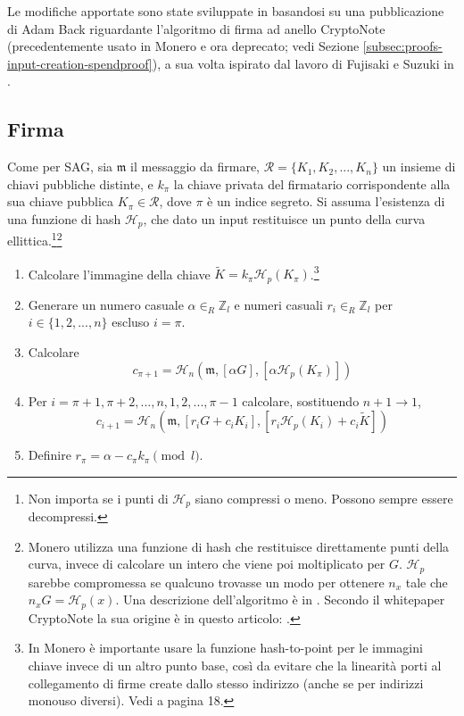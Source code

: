 Le modifiche apportate sono state sviluppate in \cite{MRL-0005-ringct} basandosi su una pubblicazione di Adam Back \cite{AdamBack-ring-efficiency} riguardante l’algoritmo di firma ad anello CryptoNote \cite{cryptoNoteWhitePaper} (precedentemente usato in Monero e ora deprecato; vedi Sezione \ref{subsec:proofs-input-creation-spendproof}), a sua volta ispirato dal lavoro di Fujisaki e Suzuki in \cite{Fujisaki2007}.


\subsection*{Firma}

Come per SAG, sia \(\mathfrak{m}\) il messaggio da firmare, \(\mathcal{R} = \{K_1, K_2, ..., K_n\}\) un insieme di chiavi pubbliche distinte, e \(k_\pi\) la chiave privata del firmatario corrispondente alla sua chiave pubblica \(K_\pi \in \mathcal{R}\), dove \(\pi\) è un indice segreto. Si assuma l'esistenza di una funzione di hash \(\mathcal{H}_p\), che dato un input restituisce un punto della curva ellittica.\footnote{Non importa se i punti di \(\mathcal{H}_p\) siano compressi o meno. Possono sempre essere decompressi.}\footnote{Monero utilizza una funzione di hash che restituisce direttamente punti della curva, invece di calcolare un intero che viene poi moltiplicato per \(G\). \(\mathcal{H}_p\) sarebbe compromessa se qualcuno trovasse un modo per ottenere \(n_x\) tale che \(n_x G = \mathcal{H}_p(x)\). Una descrizione dell'algoritmo è in \cite{hashtopoint-writeup}. Secondo il whitepaper CryptoNote \cite{cryptoNoteWhitePaper} la sua origine è in questo articolo: \cite{hashtopoint-original-paper}.}

\begin{enumerate}
	\item Calcolare l'immagine della chiave \(\tilde{K} = k_\pi \mathcal{H}_p(K_\pi)\).\footnote{In Monero è importante usare la funzione hash-to-point per le immagini chiave invece di un altro punto base, così da evitare che la linearità porti al collegamento di firme create dallo stesso indirizzo (anche se per indirizzi monouso diversi). Vedi \cite{cryptoNoteWhitePaper} a pagina 18.}

	\item Generare un numero casuale \(\alpha \in_R \mathbb{Z}_l\) e numeri casuali \(r_i \in_R \mathbb{Z}_l\) per \(i \in \{1, 2, ..., n\}\) escluso \(i = \pi\).

	\item Calcolare
	\[c_{\pi+1} = \mathcal{H}_n(\mathfrak{m}, [\alpha G], [\alpha \mathcal{H}_p(K_\pi)])\]

	\item Per \(i = \pi+1, \pi+2, ..., n, 1, 2, ..., \pi-1\) calcolare, sostituendo \(n + 1 \rightarrow 1\),\vspace{.175cm}
	\[c_{i+1} = \mathcal{H}_n(\mathfrak{m}, [r_i G + c_i K_i], [r_i \mathcal{H}_p(K_i) + c_i \tilde{K}])\]

	\item Definire \(r_\pi = \alpha - c_\pi k_\pi \pmod l\).
\end{enumerate}

